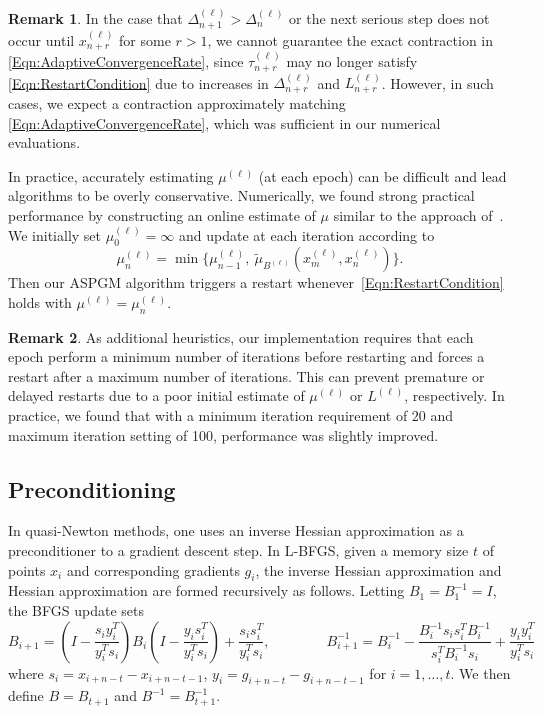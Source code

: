 \documentclass[11pt]{article}
\numberwithin{equation}{section}
\newcommand{\idxEpoch}{\ell}
\newcommand{\epoch}[1]{{#1}^{(\idxEpoch)}}
\theoremstyle{definition}
\newtheorem{remark}{Remark}
\theoremstyle{plain}
\theoremstyle{definition}
\begin{document}
\begin{remark}
    In the case that $\epoch{\Delta}_{n+1} > \epoch{\Delta}_n$ or the next serious step does not occur until $\epoch{x}_{n+r}$ for some $r>1$, we cannot guarantee the exact contraction in \eqref{Eqn:AdaptiveConvergenceRate}, since $\epoch{\tau}_{n+r}$ may no longer satisfy \eqref{Eqn:RestartCondition} due to increases in $\epoch{\Delta}_{n+r}$ and $\epoch{L}_{n+r}$. However, in such cases, we expect a contraction approximately matching \eqref{Eqn:AdaptiveConvergenceRate}, which was sufficient in our numerical evaluations.
\end{remark}

In practice, accurately estimating $\epoch{\mu}$ (at each epoch) can be difficult and lead algorithms to be overly conservative. Numerically, we found strong practical performance by constructing an online estimate of $\mu$ similar to the approach of~\cite{NAGFree_Cavalcanti}. We initially set $\epoch{\mu}_0=\infty$ and update at each iteration according to
\begin{equation} \label{Eqn:MuCalculation}
    \epoch{\mu}_n = \min\{ \epoch{\mu}_{n-1}, \ \tilde{\mu}_{\epoch{B}}(\epoch{x}_m, \epoch{x}_n) \}.
\end{equation}
Then our ASPGM algorithm triggers a restart whenever~\eqref{Eqn:RestartCondition} holds with $\epoch{\mu}=\epoch{\mu}_n$.

\begin{remark}
    As additional heuristics, our implementation requires that each epoch perform a minimum number of iterations before restarting and forces a restart after a maximum number of iterations. This can prevent premature or delayed restarts due to a poor initial estimate of $\epoch{\mu}$ or $\epoch{L}$, respectively. In practice, we found that with a minimum iteration requirement of $20$ and maximum iteration setting of 100, performance was slightly improved.
\end{remark}


\subsection{Preconditioning} \label{SubSec:Precon}

In quasi-Newton methods, one uses an inverse Hessian approximation as a preconditioner to a gradient descent step. In L-BFGS, given a memory size $t$ of points $x_i$ and corresponding gradients $g_i$, the inverse Hessian approximation and Hessian approximation are formed recursively as follows. Letting $B_1 = B_1^{-1} = I$, the BFGS update sets
\begin{equation} \label{Eqn:BFGS_Formula}
    B_{i+1} = (I - \frac{s_i y_i^T}{y_i^T s_i}) B_i (I-\frac{y_i s_i^T}{y_i^T s_i}) +  \frac{s_i s_i^T}{y_i^T s_i},
    \qquad\qquad
    B_{i+1}^{-1} = B_i^{-1} - \frac{B_i^{-1} s_i s_i^T B_i^{-1}}{s_i^T B_i^{-1} s_i} + \frac{y_i y_i^T}{y_i^T s_i}
\end{equation}
where $s_i = x_{i+n-t} - x_{i+n-t-1}$, $y_i = g_{i+n-t} - g_{i+n-t-1}$ for $i=1,\dots,t$. We then define $B = B_{t+1}$ and $B^{-1} = B_{t+1}^{-1}$.
\end{document}
